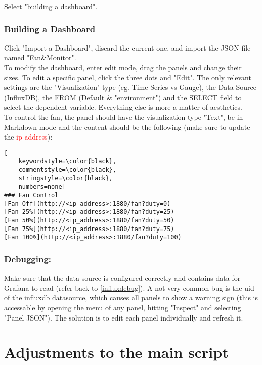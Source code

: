 \documentclass[onecolumn]{article}
\begin{document}
Select "building a dashboard".

\subsubsection{Building a Dashboard}
\normalsize
Click "Import a Dashboard", discard the current one, and import the JSON file named "Fan\&Monitor".\\

To modify the dashboard, enter edit mode, drag the panels and change their sizes. To edit a specific panel, click the three dots and "Edit". The only relevant settings are the "Visualization" type (eg. Time Series vs Gauge), the Data Source (InfluxDB), the FROM (Default \& "environment") and the SELECT field to select the dependent variable. Everything else is more a matter of aesthetics. \\

To control the fan, the panel should have the visualization type "Text", be in Markdown mode and the content should be the following (make sure to update the \textcolor{red}{ip address}): \\

\begin{lstlisting}[
    keywordstyle=\color{black},
    commentstyle=\color{black},
    stringstyle=\color{black},
    numbers=none]
### Fan Control 
[Fan Off](http://<ip_address>:1880/fan?duty=0)  
[Fan 25%](http://<ip_address>:1880/fan?duty=25) 
[Fan 50%](http://<ip_address>:1880/fan?duty=50) 
[Fan 75%](http://<ip_address>:1880/fan?duty=75) 
[Fan 100%](http://<ip_address>:1880/fan?duty=100)
\end{lstlisting}

\subsubsection{Debugging:}
Make sure that the data source is configured correctly and contains data for Grafana to read (refer back to \ref{influxdebug}). A not-very-common bug is the uid of the influxdb datasource, which causes all panels to show a warning sign (this is accessable by opening the menu of any panel, hitting "Inspect" and selecting "Panel JSON"). The solution is to edit each panel individually and refresh it. 
   



\section{Adjustments to the main script}
\end{document}
